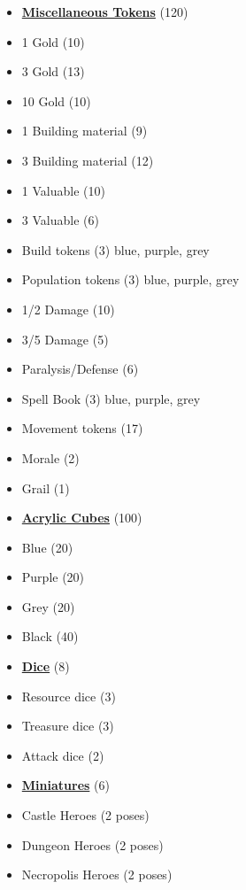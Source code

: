 \begin{multicols}{3}
\begin{itemize}[leftmargin=0pt, label={}, noitemsep, noitemsep]
  \item \textbf{\underline{Miscellaneous Tokens}} (120)
  \item 1 Gold (10)
  \item 3 Gold (13)
  \item 10 Gold (10)
  \item 1 Building material (9)
  \item 3 Building material (12)
  \item 1 Valuable (10)
  \item 3 Valuable (6)
  \item Build tokens (3) {blue, purple, grey}
  \item Population tokens (3) {blue, purple, grey}
  \item 1/2 Damage (10)
  \item 3/5 Damage (5)
  \item Paralysis/Defense (6)
  \item Spell Book (3) {blue, purple, grey}
  \item Movement tokens (17)
  \item Morale (2)
  \item Grail (1)
\end{itemize}

\begin{itemize}[leftmargin=0pt, label={}, noitemsep, noitemsep]
  \item \textbf{\underline{Acrylic Cubes}} (100)
  \item Blue (20)
  \item Purple (20)
  \item Grey (20)
  \item Black (40)
\end{itemize}

\begin{itemize}[leftmargin=0pt, label={}, noitemsep, noitemsep]
  \item \textbf{\underline{Dice}} (8)
  \item Resource dice (3)
  \item Treasure dice (3)
  \item Attack dice (2)
\end{itemize}

\begin{itemize}[leftmargin=0pt, label={}, noitemsep, noitemsep]
  \item \textbf{\underline{Miniatures}} (6)
  \item Castle Heroes (2 poses)
  \item Dungeon Heroes (2 poses)
  \item Necropolis Heroes (2 poses)
\end{itemize}


\end{multicols}
